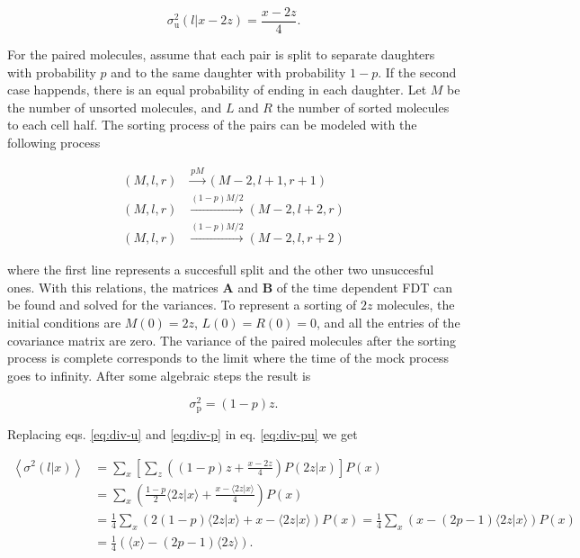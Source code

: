 \begin{equation}
  \label{eq:div-u}
  \sigma^2_\text{u}(l|x-2z) = \frac{x-2z}{4}.
\end{equation}

For the paired molecules, assume that each pair is split to separate daughters with probability $p$ and to the same daughter with probability $1-p$. If the second case happends, there is an equal probability of ending in each daughter. Let $M$ be the number of unsorted molecules, and $L$ and $R$ the number of sorted molecules to each cell half. The sorting process of the pairs can be modeled with the following process

\begin{equation}
  \begin{split}
    (M,l,r)&\xrightarrow{pM}(M-2,l+1,r+1)\\
    (M,l,r)&\xrightarrow{(1-p)M/2}(M-2,l+2,r)\\
    (M,l,r)&\xrightarrow{(1-p)M/2}(M-2,l,r+2)
  \end{split}
\end{equation}

where the first line represents a succesfull split and the other two unsuccesful ones. With this relations, the matrices $\mathbf{A}$ and $\mathbf{B}$ of the time dependent FDT can be found and solved for the variances. To represent a sorting of $2z$ molecules, the initial conditions are $M(0) = 2z$, $L(0) = R(0)=0$, and all the entries of the covariance matrix are zero. The variance of the paired molecules after the sorting process is complete corresponds to the limit where the time of the mock process goes to infinity. After some algebraic steps the result is

\begin{equation}
  \label{eq:div-p}
  \sigma^2_\text{p}=(1-p)z.
\end{equation}

Replacing eqs. \eqref{eq:div-u} and \eqref{eq:div-p} in eq. \eqref{eq:div-pu} we get

\begin{equation}
  \begin{split}
    \left\langle\sigma^2(l|x)\right\rangle &=\sum_{x}\left[\sum_z\left((1-p)z+\frac{x-2z}{4}\right)P(2z|x)\right]P(x)\\
&=\sum_x\left(\frac{1-p}{2}\langle 2z|x\rangle+\frac{x-\langle 2z|x\rangle}{4}\right)P(x)\\
    &=\frac{1}{4}\sum_x\left(2(1-p)\langle 2z|x\rangle+x-\langle 2z|x\rangle\right)P(x) = \frac{1}{4}\sum_x\left(x-(2p-1)\langle 2z|x\rangle\right)P(x)\\
    &=\frac{1}{4}\left(\langle x\rangle - (2p-1)\langle 2z\rangle\right).
  \end{split}
\end{equation}

